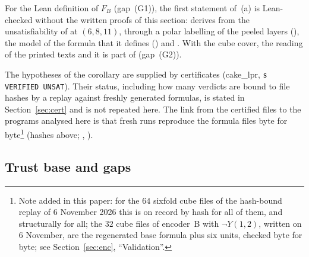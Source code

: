 For the Lean definition  of $F_B$ (gap~(G1)), the first statement of~(a) is Lean-checked without the
written proofs of this section:  derives  from the unsatisfiability
of  at $(6,8,11)$, through a polar labelling of the peeled layers
(), the model of the formula that it defines
() and . With the cube cover, the reading of the printed
texts and  it is part of  (gap~(G2)).

The hypotheses of the corollary are supplied by certificates (cake\_lpr, \texttt{s VERIFIED UNSAT}). Their status,
including how many verdicts are bound to file hashes by a replay against freshly generated formulas, is stated in Section~\ref{sec:cert} and is not repeated here. The link
from the certified files to the programs analysed here is that fresh runs reproduce the formula files byte for byte\footnote{Note added in this paper: for the $64$ sixfold cube files of the hash-bound replay of 6 November 2026 this is on record by hash for all of them, and structurally for all; the $32$ cube files of encoder~B with $\neg Y(1,2)$, written on 6 November, are the regenerated base formula plus six units, checked byte for byte; see Section~\ref{sec:enc}, ``Validation''.}
(hashes above; , ).

\subsection{Trust base and gaps}\label{k8s:sec:trust}

